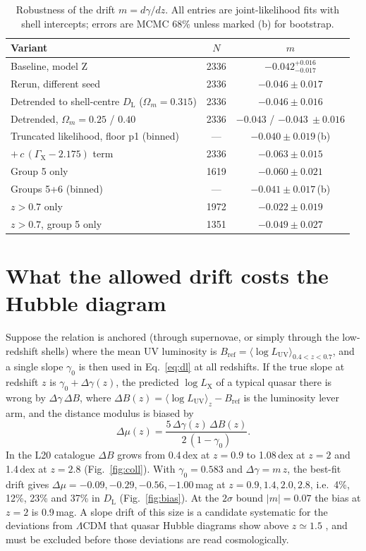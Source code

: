 \documentclass[twocolumn,10pt]{article}
\newcommand{\LX}{L_{\mathrm{X}}}
\newcommand{\LUV}{L_{\mathrm{UV}}}
\newcommand{\DL}{D_{\mathrm{L}}}
\begin{document}
\begin{table}
\centering\small
\caption{Robustness of the drift $m=d\gamma/dz$. All entries are joint-likelihood fits with shell intercepts; errors are MCMC 68\% unless marked (b) for bootstrap.}
\label{tab:robust}
\begin{tabular}{lcc}
\toprule
Variant & $N$ & $m$\\
\midrule
Baseline, model Z & 2336 & $-0.042^{+0.016}_{-0.017}$\\
Rerun, different seed & 2336 & $-0.046\pm0.017$\\
Detrended to shell-centre $\DL$ ($\Omega_m=0.315$) & 2336 & $-0.046\pm0.016$\\
Detrended, $\Omega_m=0.25$ / $0.40$ & 2336 & $-0.043$ / $-0.043\ \pm0.016$\\
Truncated likelihood, floor p1 (binned) & --- & $-0.040\pm0.019$\,(b)\\
$+\,c\,(\Gamma_{\mathrm{X}}-2.175)$ term & 2336 & $-0.063\pm0.015$\\
Group 5 only & 1619 & $-0.060\pm0.021$\\
Groups 5+6 (binned) & --- & $-0.041\pm0.017$\,(b)\\
$z>0.7$ only & 1972 & $-0.022\pm0.019$\\
$z>0.7$, group 5 only & 1351 & $-0.049\pm0.027$\\
\bottomrule
\end{tabular}
\end{table}

\section{What the allowed drift costs the Hubble diagram}
\label{sec:cost}
Suppose the relation is anchored (through supernovae, or simply through the low-redshift shells) where the mean UV luminosity is $B_{\mathrm{ref}}=\langle\log\LUV\rangle_{0.4<z<0.7}$, and a single slope $\gamma_0$ is then used in Eq.~\ref{eq:dl} at all redshifts. If the true slope at redshift $z$ is $\gamma_0+\Delta\gamma(z)$, the predicted $\log\LX$ of a typical quasar there is wrong by $\Delta\gamma\,\Delta B$, where $\Delta B(z)=\langle\log\LUV\rangle_z-B_{\mathrm{ref}}$ is the luminosity lever arm, and the distance modulus is biased by
\begin{equation}
\Delta\mu(z)=\frac{5\,\Delta\gamma(z)\,\Delta B(z)}{2\,(1-\gamma_0)} .
\label{eq:bias}
\end{equation}
In the L20 catalogue $\Delta B$ grows from 0.4\,dex at $z=0.9$ to 1.08\,dex at $z=2$ and 1.4\,dex at $z=2.8$ (Fig.~\ref{fig:coll}). With $\gamma_0=0.583$ and $\Delta\gamma=m\,z$, the best-fit drift gives $\Delta\mu=-0.09, -0.29, -0.56, -1.00$\,mag at $z=0.9, 1.4, 2.0, 2.8$, i.e.\ 4\%, 12\%, 23\% and 37\% in $\DL$ (Fig.~\ref{fig:bias}). At the $2\sigma$ bound $|m|=0.07$ the bias at $z=2$ is 0.9\,mag. A slope drift of this size is a candidate systematic for the deviations from $\Lambda$CDM that quasar Hubble diagrams show above $z\simeq1.5$ \citep{khadka21,lusso25}, and must be excluded before those deviations are read cosmologically.
\end{document}

